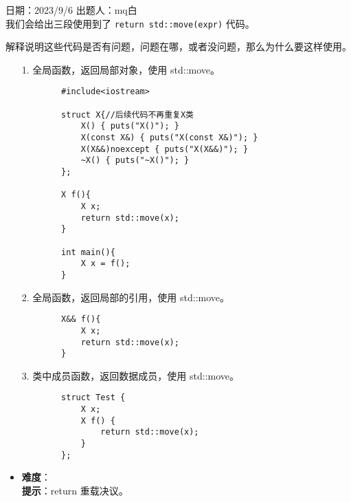 日期：2023/9/6 出题人：mq白\\

我们会给出三段使用到了 \texttt{return std::move(expr)} 代码。

解释说明这些代码是否有问题，问题在哪，或者没问题，那么为什么要这样使用。

\begin{itemize}
    \item [1.]
          全局函数，返回局部对象，使用 std::move。
          \begin{verbatim}
        #include<iostream>

        struct X{//后续代码不再重复X类
            X() { puts("X()"); }
            X(const X&) { puts("X(const X&)"); }
            X(X&&)noexcept { puts("X(X&&)"); }
            ~X() { puts("~X()"); }
        };
        
        X f(){
            X x;
            return std::move(x);
        }
        
        int main(){
            X x = f();
        }
    \end{verbatim}
    \item [2.]
          全局函数，返回局部的引用，使用 std::move。
          \begin{verbatim}
        X&& f(){
            X x;
            return std::move(x);
        }
    \end{verbatim}
    \item [3.]
          类中成员函数，返回数据成员，使用 std::move。
          \begin{verbatim}
        struct Test {
            X x;
            X f() {
                return std::move(x);
            }
        };
    \end{verbatim}
\end{itemize}

\begin{itemize}
    \item \textbf{难度}：  \\
          \textbf{提示}：return 重载决议。
\end{itemize}